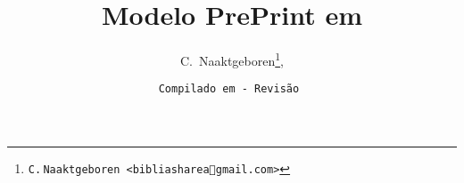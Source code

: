 \newcommand{\XXX}[1]{\relax}
\newcommand{\YA}{%
    \mbox{%
        Y\makebox[0pt][l]{\hspace{-0.178em}\raisebox{-0.00ex}{\scalebox{0.30}{E}}}%
        H\makebox[0pt][l]{\hspace{-0.010em}\raisebox{-0.00ex}{\scalebox{0.30}{O}}}%
        W\makebox[0pt][l]{\hspace{-0.245em}\raisebox{-0.00ex}{\scalebox{0.30}{A}}}%
        H%
    }%
}
\newcommand{\bQuote}[1]{``\textrm{\addfontfeature{ScriptureColor}{#1}}''}
\newcommand{\bLineQuote}[3]{\bQuote{{#1}} {#2} ({#3})~\cite{{#3}}}
\newcommand{\bBlockQuoteAft}[3]{%
    \begin{adjustwidth}{0.1\linewidth}{0.1\linewidth}
        \parindent 0pt
        \bQuote{{#1}} ---~{#2} ({#3})~\cite{{#3}}
    \end{adjustwidth}
    \vspace*{0.25\baselineskip}
}
\newcommand{\bBlockQuote}[3]{%
    \vspace*{0.25\baselineskip}%
    \bBlockQuoteAft{{#1}}{{#2}}{{#3}}%
}

\makeatletter
\immediate{}
\immediate{}
\makeatother
\title{\textbf{Modelo PrePrint em \XeLaTeX}}
\author{C.~Naaktgeboren\thanks{\texttt{C.$\,$Naaktgeboren <bibliashare\textcircled{a}gmail.com>}},}
\date{{\scriptsize\texttt{Compilado em  - Revisão }}}
